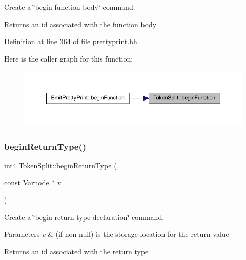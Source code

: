 Create a \char`\"{}begin function body\char`\"{} command. 

\begin{DoxyReturn}{Returns}
an id associated with the function body 
\end{DoxyReturn}


Definition at line 364 of file prettyprint.\+hh.

Here is the caller graph for this function\+:
\nopagebreak
\begin{figure}[H]
\begin{center}
\leavevmode
\includegraphics[width=350pt]{class_token_split_a53510d715ff1109c33f75226e429d8e7_icgraph}
\end{center}
\end{figure}
\mbox{\label{class_token_split_a2e4f04db795faf9a88e4e575744c65eb}} 
\subsubsection{\texorpdfstring{beginReturnType()}{beginReturnType()}}
{\footnotesize\ttfamily int4 Token\+Split\+::begin\+Return\+Type (\begin{DoxyParamCaption}\item[{const \mbox{\hyperlink{class_varnode}{Varnode}} $\ast$}]{v }\end{DoxyParamCaption})\hspace{0.3cm}{\ttfamily [inline]}}



Create a \char`\"{}begin return type declaration\char`\"{} command. 


\begin{DoxyParams}{Parameters}
{\em v} & (if non-\/null) is the storage location for the return value \\
\hline
\end{DoxyParams}
\begin{DoxyReturn}{Returns}
an id associated with the return type 
\end{DoxyReturn}


